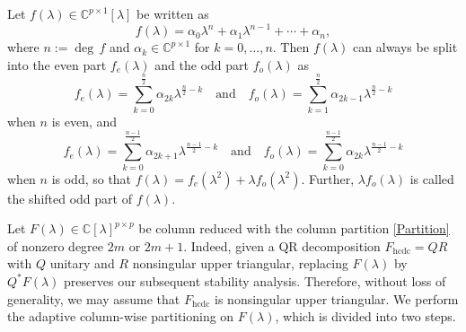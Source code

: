 \documentclass[12pt,reqno]{amsart}
\theoremstyle{plain}
\numberwithin{equation}{section}
\theoremstyle{remark}
\begin{document}
Let $f(\lambda)\in \mathbb{C}^{p\times 1}[\lambda]$ be written as 
\begin{equation*}
f(\lambda)=\alpha_{0} \lambda^{n}+\alpha_{1} \lambda^{n-1}+\cdots+\alpha_{n},
\end{equation*}
where $n:=\deg\,f$ and $\alpha_k\in \mathbb{C}^{p\times 1}$ for $k=0,\ldots,n$.
 Then $f(\lambda)$ can always be split into the even part $f_{e}(\lambda)$ and the odd part $f_{o}(\lambda)$ as
    \begin{equation*}
  f_{e}(\lambda)=\sum_{k=0}^\frac n2\alpha_{2k}\lambda^{\frac n2-k}
  \quad\text{and}\quad
  f_{o}(\lambda)=\sum_{k=1}^\frac n2 \alpha_{2k-1}\lambda^{\frac n2-k}
\end{equation*}
when $n$ is even, and
\begin{equation*}
    f_{e}(\lambda)=\sum_{k=0}^\frac {n-1}2 \alpha_{2k+1}\lambda^{\frac {n-1}2-k}
    \quad\text{and}\quad
    f_{o}(\lambda)=\sum_{k=0}^\frac {n-1}2 \alpha_{2k}\lambda^{\frac {n-1}2-k}
\end{equation*}
when $n$ is odd,
     so that
    \( 
        f(\lambda)=f_{e}(\lambda^2)+\lambda f_{o}(\lambda^2).
    \) Further, $\lambda f_o(\lambda)$ is called the shifted odd part of $f(\lambda)$.

 
Let $F(\lambda)\in \mathbb C[\lambda]^{p\times p}$ be column reduced with the column partition \eqref{Partition} of nonzero degree $2m$ or $2m+1$.  
Indeed, given a QR decomposition $F_{\mathrm{hcdc}} = QR$ with $Q$ unitary and $R$ nonsingular 
upper triangular, replacing $F(\lambda)$ by $Q^*F(\lambda)$ preserves our subsequent stability analysis. Therefore, without loss of generality, we may assume that  $F_{\mathrm{hcdc}}$ is nonsingular upper triangular.
We perform the adaptive column-wise partitioning on $F(\lambda)$, which is divided into two steps.
\end{document}
